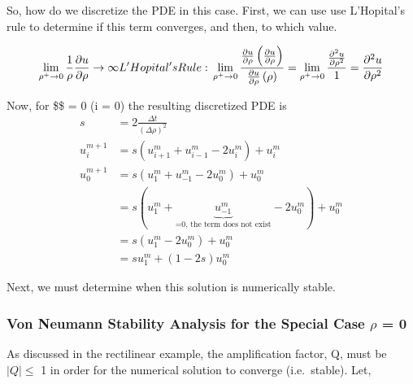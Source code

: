 \documentclass[11pt]{article}
\begin{document}
    So, how do we discretize the PDE in this case. First, we can use use
L'Hopital's rule to determine if this term converges, and then, to which
value.

\begin{equation}
\lim_{\rho^{+} \rightarrow 0} \frac{1}{\rho} \frac {\partial u}{\partial \rho} \rightarrow \infty \\
L'Hopital's Rule: \\
\lim_{\rho^{+} \rightarrow 0} \frac{\frac {\partial u}{\partial \rho} \left(\frac {\partial u}{\partial \rho} \right) }{\frac {\partial u}{\partial \rho} \left(\rho\right)} =
\lim_{\rho^{+} \rightarrow 0} \frac{\frac{\partial^2 u}{\partial \rho^2}}{1} =
\frac{\partial^2 u}{\partial \rho^2}
\end{equation}

Now, for \$\rho \$ = 0 (i = 0) the resulting discretized PDE is
\begin{equation}
\begin{split}
s &= 2 \frac{\Delta t}{(\Delta \rho)^2} \\
u_{i}^{m + 1} &= s \left(u_{i + 1}^m + u_{i - 1 }^m - 2 u_{i}^m \right) +  u_{i}^{m} \\
u_{0}^{m + 1} &= s \left(u_{1}^m + u_{- 1}^m - 2 u_{0}^m \right) +  u_{0}^{m} \\
&= s \left(u_{1}^m + \underbrace{u_{- 1}^m}_{\text{=0, the term does not exist}} - 2 u_{0}^m \right) +  u_{0}^{m} \\
&= s \left(u_{1}^m - 2 u_{0}^m \right) +  u_{0}^{m} \\
&= s u_{1}^m + (1 - 2s) u_{0}^m 
\end{split}
\end{equation}

Next, we must determine when this solution is numerically stable.

    \hypertarget{von-neumann-stability-analysis-for-the-special-case-rho-0}{%
\subsubsection{\texorpdfstring{Von Neumann Stability Analysis for the
Special Case \(\rho\) =
0}{Von Neumann Stability Analysis for the Special Case \textbackslash rho = 0}}\label{von-neumann-stability-analysis-for-the-special-case-rho-0}}

    As discussed in the rectilinear example, the amplification factor, Q,
must be \(\vert Q \vert \leq\) 1 in order for the numerical solution to
converge (i.e.~stable). Let,
\end{document}
